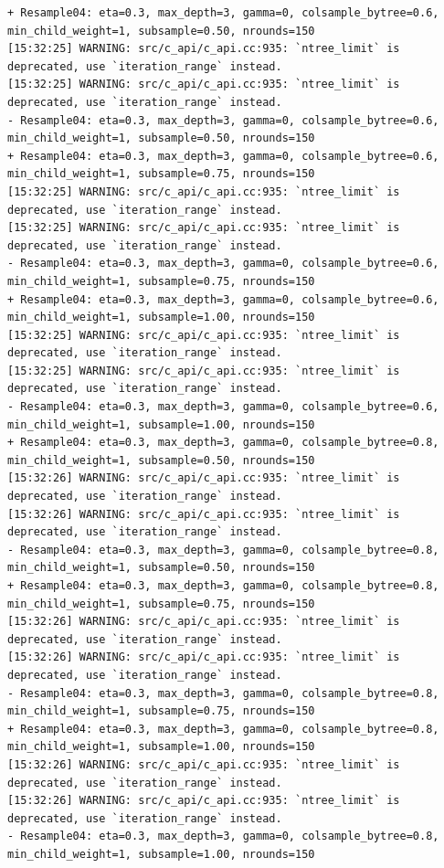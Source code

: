 \documentclass[
  letterpaper,
  DIV=11,
  numbers=noendperiod]{scrartcl}
\begin{document}
\begin{verbatim}
+ Resample04: eta=0.3, max_depth=3, gamma=0, colsample_bytree=0.6, min_child_weight=1, subsample=0.50, nrounds=150 
[15:32:25] WARNING: src/c_api/c_api.cc:935: `ntree_limit` is deprecated, use `iteration_range` instead.
[15:32:25] WARNING: src/c_api/c_api.cc:935: `ntree_limit` is deprecated, use `iteration_range` instead.
- Resample04: eta=0.3, max_depth=3, gamma=0, colsample_bytree=0.6, min_child_weight=1, subsample=0.50, nrounds=150 
+ Resample04: eta=0.3, max_depth=3, gamma=0, colsample_bytree=0.6, min_child_weight=1, subsample=0.75, nrounds=150 
[15:32:25] WARNING: src/c_api/c_api.cc:935: `ntree_limit` is deprecated, use `iteration_range` instead.
[15:32:25] WARNING: src/c_api/c_api.cc:935: `ntree_limit` is deprecated, use `iteration_range` instead.
- Resample04: eta=0.3, max_depth=3, gamma=0, colsample_bytree=0.6, min_child_weight=1, subsample=0.75, nrounds=150 
+ Resample04: eta=0.3, max_depth=3, gamma=0, colsample_bytree=0.6, min_child_weight=1, subsample=1.00, nrounds=150 
[15:32:25] WARNING: src/c_api/c_api.cc:935: `ntree_limit` is deprecated, use `iteration_range` instead.
[15:32:25] WARNING: src/c_api/c_api.cc:935: `ntree_limit` is deprecated, use `iteration_range` instead.
- Resample04: eta=0.3, max_depth=3, gamma=0, colsample_bytree=0.6, min_child_weight=1, subsample=1.00, nrounds=150 
+ Resample04: eta=0.3, max_depth=3, gamma=0, colsample_bytree=0.8, min_child_weight=1, subsample=0.50, nrounds=150 
[15:32:26] WARNING: src/c_api/c_api.cc:935: `ntree_limit` is deprecated, use `iteration_range` instead.
[15:32:26] WARNING: src/c_api/c_api.cc:935: `ntree_limit` is deprecated, use `iteration_range` instead.
- Resample04: eta=0.3, max_depth=3, gamma=0, colsample_bytree=0.8, min_child_weight=1, subsample=0.50, nrounds=150 
+ Resample04: eta=0.3, max_depth=3, gamma=0, colsample_bytree=0.8, min_child_weight=1, subsample=0.75, nrounds=150 
[15:32:26] WARNING: src/c_api/c_api.cc:935: `ntree_limit` is deprecated, use `iteration_range` instead.
[15:32:26] WARNING: src/c_api/c_api.cc:935: `ntree_limit` is deprecated, use `iteration_range` instead.
- Resample04: eta=0.3, max_depth=3, gamma=0, colsample_bytree=0.8, min_child_weight=1, subsample=0.75, nrounds=150 
+ Resample04: eta=0.3, max_depth=3, gamma=0, colsample_bytree=0.8, min_child_weight=1, subsample=1.00, nrounds=150 
[15:32:26] WARNING: src/c_api/c_api.cc:935: `ntree_limit` is deprecated, use `iteration_range` instead.
[15:32:26] WARNING: src/c_api/c_api.cc:935: `ntree_limit` is deprecated, use `iteration_range` instead.
- Resample04: eta=0.3, max_depth=3, gamma=0, colsample_bytree=0.8, min_child_weight=1, subsample=1.00, nrounds=150 

\end{verbatim}
\end{document}
